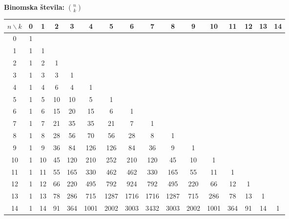 \documentclass[a4paper,oneside,12pt]{article}
\newenvironment{description*}%
{
\begin{description}
\setlength{\itemsep}{0pt}
\setlength{\parskip}{2pt}
}
{\end{description}}
\begin{document}
\begin{description*}
{    \textbf{Binomska števila:} $\binom{n}{k}$ \\
    \begin{tabular}{|*{16}{c|}}
      \hline
      $n \backslash k$ & 0&1&2&3&4&5&6&7&8&9&10&11&12&13&14\\ \hline
      0 & 1 &  &  &  &  &  &  &  &  &  &  &  &  &  & \\ \hline
      1 & 1 & 1 &  &  &  &  &  &  &  &  &  &  &  &  & \\ \hline
      2 & 1 & 2 & 1 &  &  &  &  &  &  &  &  &  &  &  & \\ \hline
      3 & 1 & 3 & 3 & 1 &  &  &  &  &  &  &  &  &  &  & \\ \hline
      4 & 1 & 4 & 6 & 4 & 1 &  &  &  &  &  &  &  &  &  & \\ \hline
      5 & 1 & 5 & 10 & 10 & 5 & 1 &  &  &  &  &  &  &  &  & \\ \hline
      6 & 1 & 6 & 15 & 20 & 15 & 6 & 1 &  &  &  &  &  &  &  & \\ \hline
      7 & 1 & 7 & 21 & 35 & 35 & 21 & 7 & 1 &  &  &  &  &  &  & \\ \hline
      8 & 1 & 8 & 28 & 56 & 70 & 56 & 28 & 8 & 1 &  &  &  &  &  & \\ \hline
      9 & 1 & 9 & 36 & 84 & 126 & 126 & 84 & 36 & 9 & 1 &  &  &  &  & \\ \hline
      10 & 1 & 10 & 45 & 120 & 210 & 252 & 210 & 120 & 45 & 10 & 1 &  &  &  & \\ \hline
      11 & 1 & 11 & 55 & 165 & 330 & 462 & 462 & 330 & 165 & 55 & 11 & 1 &  &  & \\ \hline
      12 & 1 & 12 & 66 & 220 & 495 & 792 & 924 & 792 & 495 & 220 & 66 & 12 & 1 &  & \\ \hline
      13 & 1 & 13 & 78 & 286 & 715 & 1287 & 1716 & 1716 & 1287 & 715 & 286 & 78 & 13 & 1 & \\ \hline
      14 & 1 & 14 & 91 & 364 & 1001 & 2002 & 3003 & 3432 & 3003 & 2002 & 1001 & 364 & 91 & 14 & 1\\ \hline
    \end{tabular}

}
\end{description*}
\end{document}
